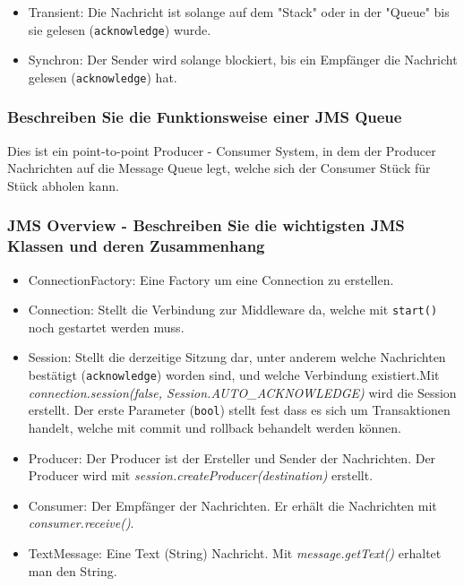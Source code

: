 \begin{itemize}
    \item Transient: Die Nachricht ist solange auf dem "Stack" oder in der "Queue" bis sie gelesen (\texttt{acknowledge}) wurde.
    \item Synchron: Der Sender wird solange blockiert, bis ein Empfänger die Nachricht gelesen (\texttt{acknowledge}) hat.
\end{itemize}

\subsubsection{Beschreiben Sie die Funktionsweise einer JMS Queue}

Dies ist ein point-to-point Producer - Consumer System, in dem der Producer Nachrichten auf die Message Queue legt, welche sich der Consumer Stück für Stück abholen kann.

\subsubsection{JMS Overview - Beschreiben Sie die wichtigsten JMS Klassen und deren Zusammenhang}

\begin{itemize}
    \item ConnectionFactory: Eine Factory um eine Connection zu erstellen.
    \item Connection: Stellt die Verbindung zur Middleware da, welche mit \texttt{start()} noch gestartet werden muss.
    \item Session: Stellt die derzeitige Sitzung dar, unter anderem welche Nachrichten bestätigt (\texttt{acknowledge}) worden sind, und welche Verbindung existiert.Mit \textit{connection.session(false, Session.AUTO\_ACKNOWLEDGE)} wird die Session erstellt. Der erste Parameter (\texttt{bool}) stellt fest dass es sich um Transaktionen handelt, welche mit commit und rollback behandelt werden können.
    \item Producer: Der Producer ist der Ersteller und Sender der Nachrichten. Der Producer wird mit \textit{session.createProducer(destination)} erstellt.
    \item Consumer: Der Empfänger der Nachrichten. Er erhält die Nachrichten mit \textit{consumer.receive()}.
    \item TextMessage: Eine Text (String) Nachricht. Mit \textit{message.getText()} erhaltet man den String.
\end{itemize}

